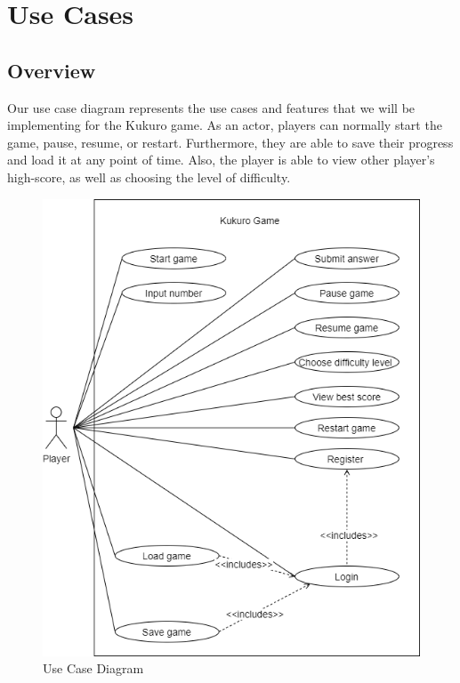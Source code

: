 \documentclass[12pt]{article}
\begin{document}
\newpage

\section{Use Cases}

\subsection{Overview}
Our use case diagram represents the use cases and features that we will be implementing for the Kukuro game. As an actor, players can normally start the game, pause, resume, or restart. Furthermore, they are able to save their progress and load it at any point of time. Also, the player is able to view other player's high-score, as well as choosing the level of difficulty.

\begin{figure}[htbp]
    \centering
    \includegraphics[scale=0.6]{UseCaseDiagram}
    \caption{Use Case Diagram}
    \label{fig:UseCaseDiagram}
\end{figure}
\end{document}

